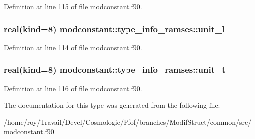 Definition at line 115 of file modconstant.\-f90.

\hypertarget{structmodconstant_1_1type__info__ramses_a28474b9ed9a3749e1fff779f23233677}{
\subsubsection[{unit\-\_\-l}]{\setlength{\rightskip}{0pt plus 5cm}real(kind=8) modconstant\-::type\-\_\-info\-\_\-ramses\-::unit\-\_\-l}}\label{structmodconstant_1_1type__info__ramses_a28474b9ed9a3749e1fff779f23233677}


Definition at line 114 of file modconstant.\-f90.

\hypertarget{structmodconstant_1_1type__info__ramses_ac057f8f4a9ab22cac7b786b5d9d869b6}{
\subsubsection[{unit\-\_\-t}]{\setlength{\rightskip}{0pt plus 5cm}real(kind=8) modconstant\-::type\-\_\-info\-\_\-ramses\-::unit\-\_\-t}}\label{structmodconstant_1_1type__info__ramses_ac057f8f4a9ab22cac7b786b5d9d869b6}


Definition at line 116 of file modconstant.\-f90.



The documentation for this type was generated from the following file\-:\begin{DoxyCompactItemize}
\item 
/home/roy/\-Travail/\-Devel/\-Cosmologie/\-Pfof/branches/\-Modif\-Struct/common/src/\hyperlink{modconstant_8f90}{modconstant.\-f90}\end{DoxyCompactItemize}
